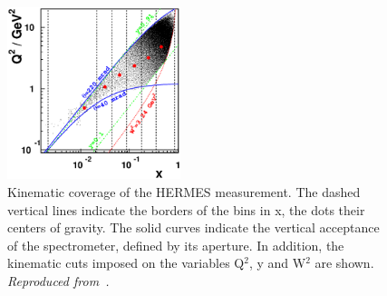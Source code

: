 





\begin{figure}
\begin{center}
\includegraphics[angle=0,width=0.45\textwidth]{figs/kineplane.eps}
\caption{\label{HERMES_KIN} Kinematic coverage of the HERMES measurement.  The dashed vertical lines indicate the borders
of the bins in x, the dots their centers of gravity. The solid curves
indicate the
vertical acceptance of the spectrometer, defined by its aperture.
In addition, the
kinematic cuts imposed on the variables Q$^2$, y
and W$^2$ are shown. 
{\it Reproduced from~\cite{Riedl:2005jq}.}}
\end{center}\end{figure}


